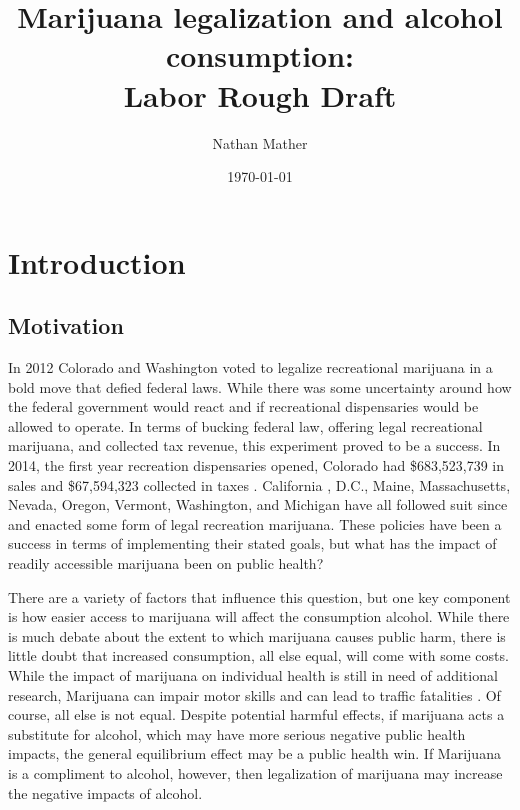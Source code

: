 \documentclass[11pt]{article}
\title{Marijuana legalization and alcohol consumption:\\
	Labor Rough Draft} %
\author{Nathan Mather} %
\date{\today} %
\begin{document}
	
	
\maketitle %

\setcounter{tocdepth}{3} %

\tableofcontents %

\section{Introduction}
\subsection{Motivation}

In 2012 Colorado and Washington voted to legalize recreational marijuana in a bold move that defied federal laws.  While there was some uncertainty around how the federal government would react and if recreational dispensaries would be allowed to operate. In terms of bucking federal law, offering legal recreational marijuana, and collected tax revenue, this experiment proved to be a success. In 2014, the first year recreation dispensaries opened, Colorado had \$683,523,739 in sales and \$67,594,323 collected in taxes \cite{Colorado_marijuana_sales}. California , D.C., Maine, Massachusetts, Nevada, Oregon, Vermont, Washington, and Michigan have all followed suit since and enacted some form of legal recreation marijuana. These policies have been a success in terms of implementing their stated goals, but what has the impact of readily accessible marijuana been on public health? \par

There are a variety of factors that influence this question, but one key component is how easier access to marijuana will affect the consumption alcohol. While there is much debate about the extent to which marijuana causes public harm, there is little doubt that increased consumption, all else equal, will come with some costs. While the impact of marijuana on individual health is still in need of additional research, Marijuana can impair motor skills and can lead to traffic fatalities \cite{webmd_mj}. Of course, all else is not equal.  Despite potential harmful effects, if marijuana acts a substitute for alcohol, which may have more serious negative public health impacts, the general equilibrium effect may be a public health win. If Marijuana is a compliment to alcohol, however, then legalization of marijuana may increase the negative impacts of alcohol. \par
\end{document}

